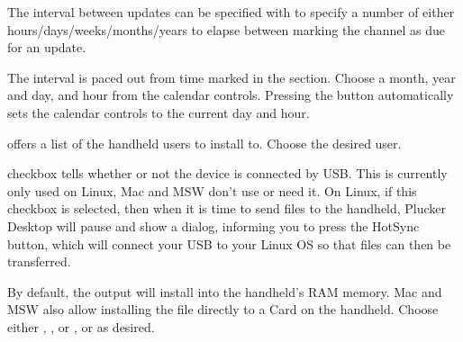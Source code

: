 The interval between updates can be specified with
 to specify a 
number of either hours/days/weeks/months/years to elapse between marking the 
channel as due for an update.

The interval is paced out from time marked in the 
section. Choose a month, year and day, and hour from the calendar controls.
Pressing the  button automatically sets the calendar
controls to the current day and hour.


 offers a list of the handheld users to install to. 
Choose the desired user.

 checkbox tells whether or not the 
device is connected by USB. This is currently only used on Linux, Mac and MSW don't 
use or need it. On Linux, if this checkbox is selected, then when it is time to 
send files to the handheld, Plucker Desktop will pause and show a dialog, informing 
you to press the HotSync button, which will connect your USB to your Linux OS so that 
files can then be transferred.

By default, the output will install into the handheld's RAM memory. 
Mac and MSW also allow installing the file directly to a Card on the handheld. 
Choose either ,
, or
, or
 as desired.



